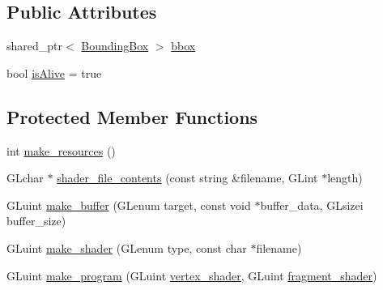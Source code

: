 \subsection*{Public Attributes}
\begin{DoxyCompactItemize}
\item 
shared\-\_\-ptr$<$ \hyperlink{classBoundingBox}{Bounding\-Box} $>$ \hyperlink{classGameAsset_a3444a096fed505b1740bedc95e2cfa6c}{bbox}
\item 
bool \hyperlink{classGameAsset_aebf93ae52dc7fabbb6ec7edaadf915d0}{is\-Alive} = true
\end{DoxyCompactItemize}
\subsection*{Protected Member Functions}
\begin{DoxyCompactItemize}
\item 
int \hyperlink{classGameAsset_aa26d85233ece476d599adf90074e9568}{make\-\_\-resources} ()
\item 
G\-Lchar $\ast$ \hyperlink{classGameAsset_a08c617aafc70dcba441f53260f1bb09f}{shader\-\_\-file\-\_\-contents} (const string \&filename, G\-Lint $\ast$length)
\item 
G\-Luint \hyperlink{classGameAsset_adfe27369433f07092b08f24b0feedfc9}{make\-\_\-buffer} (G\-Lenum target, const void $\ast$buffer\-\_\-data, G\-Lsizei buffer\-\_\-size)
\item 
G\-Luint \hyperlink{classGameAsset_ac728e885b52c93c3e4976a339de54545}{make\-\_\-shader} (G\-Lenum type, const char $\ast$filename)
\item 
G\-Luint \hyperlink{classGameAsset_a9d9574a21cf6b52f7a825879ca50b19d}{make\-\_\-program} (G\-Luint \hyperlink{classGameAsset_aba95de2870f78ac21568bbf9dd7e2b40}{vertex\-\_\-shader}, G\-Luint \hyperlink{classGameAsset_ab62d9e2547537bd89eeae057a402a895}{fragment\-\_\-shader})
\end{DoxyCompactItemize}
